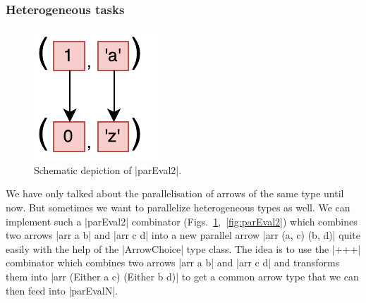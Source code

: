 \subsubsection{Heterogeneous tasks}
\begin{figure}[tb]
	\includegraphics[scale=0.7]{images/parEval2}
	\caption{Schematic depiction of |parEval2|.}
	\label{fig:parEval2Img}
\end{figure}
We have only talked about the parallelisation of arrows of the same type until now. But sometimes we want to parallelize heterogeneous types as well. We can implement such a |parEval2| combinator (Figs.~\ref{fig:parEval2Img},~\ref{fig:parEval2}) which combines two arrows |arr a b| and |arr c d| into a new parallel arrow |arr (a, c) (b, d)| quite easily with the help of the |ArrowChoice| type class. The idea is to use the |+++| combinator which combines two arrows |arr a b| and |arr c d| and transforms them into |arr (Either a c) (Either b d)| to get a common arrow type that we can then feed into |parEvalN|.

